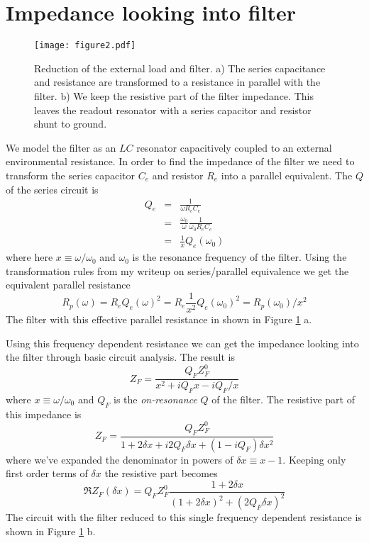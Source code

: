 \documentclass[english,aps,prl]{revtex4}
\begin{document}
\section{Impedance looking into filter}

\begin{figure}
\begin{centering}
\texttt{[image: figure2.pdf]} 
\par\end{centering}
\caption{Reduction of the external load and filter. a) The series capacitance and resistance are transformed to a resistance in parallel with the filter. b) We keep the resistive part of the filter impedance. This leaves the readout resonator with a series capacitor and resistor shunt to ground.}
\label{Fig:2}
\end{figure}

We model the filter as an $LC$ resonator capacitively coupled to an external environmental resistance. In order to find the impedance of the filter we need to transform the series capacitor $C_e$ and resistor $R_e$ into a parallel equivalent. The $Q$ of the series circuit is \begin{eqnarray}
Q_e &=& \frac{1}{\omega R_e C_e} \\
&=& \frac{\omega_0}{\omega} \frac{1}{\omega_0 R_e C_e} \\
&=& \frac{1}{x} Q_e(\omega_0) \end{eqnarray}
where here $x\equiv \omega/\omega_0$ and $\omega_0$ is the resonance frequency of the filter. Using the transformation rules from my writeup on series/parallel equivalence we get the equivalent parallel resistance \begin{equation}
R_p(\omega) = R_e Q_e(\omega)^2 = R_e \frac{1}{x^2}Q_e(\omega_0)^2 = R_p(\omega_0)/x^2 \end{equation}
The filter with this effective parallel resistance in shown in Figure \ref{Fig:2} a.

Using this frequency dependent resistance we can get the impedance looking into the filter through basic circuit analysis. The result is \begin{equation}
Z_F = \frac{Q_F Z_F^0}{x^2 + iQ_F x - iQ_F/x} \end{equation}
where $x\equiv \omega/\omega_0$ and $Q_F$ is the \emph{on-resonance} $Q$ of the filter. The resistive part of this impedance is \begin{equation}
Z_F = \frac{Q_F Z_F^0}{1+2\delta x + i2Q_F \delta x + (1-iQ_F)\delta x^2}
\end{equation}
where we've expanded the denominator in powers of $\delta x \equiv x-1$. Keeping only first order terms of $\delta x$ the resistive part becomes \begin{equation}
\Re Z_F(\delta x) = Q_F Z_F^0 \frac{1+2\delta x}{(1+2\delta x)^2 + (2Q_F \delta x)^2} \end{equation}
The circuit with the filter reduced to this single frequency dependent resistance is shown in Figure \ref{Fig:2} b.
\end{document}
